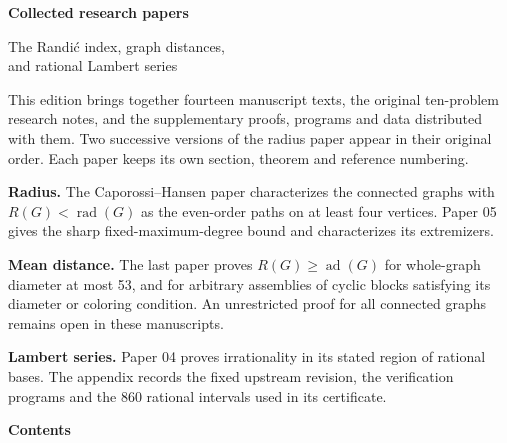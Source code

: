 \documentclass[11pt,a4paper]{article}
\newcommand{\rad}{\operatorname{rad}}\newcommand{\diam}{\operatorname{diam}}
\begin{document}
\thispagestyle{empty}
\vspace*{19mm}\par\vspace{13mm}
{\noindent\fontsize{33}{39}\selectfont\bfseries Collected research papers\par}
\vspace{5mm}
{\noindent\LARGE The Randi\'c index, graph distances,\\[3pt]and rational Lambert series\par}
\vspace{10mm}\noindent{\color{volblue}\rule{0.25\linewidth}{1.1pt}}\par\vspace{9mm}
\noindent This edition brings together fourteen manuscript texts, the original ten-problem research notes, and the supplementary proofs, programs and data distributed with them. Two successive versions of the radius paper appear in their original order. Each paper keeps its own section, theorem and reference numbering.\par
\vspace{6mm}
\noindent\textbf{Radius.} The Caporossi--Hansen paper characterizes the connected graphs with $R(G)<\rad(G)$ as the even-order paths on at least four vertices. Paper 05 gives the sharp fixed-maximum-degree bound and characterizes its extremizers.\par\vspace{4mm}
\noindent\textbf{Mean distance.} The last paper proves $R(G)\ge\operatorname{ad}(G)$ for whole-graph diameter at most 53, and for arbitrary assemblies of cyclic blocks satisfying its diameter or coloring condition. An unrestricted proof for all connected graphs remains open in these manuscripts.\par\vspace{4mm}
\noindent\textbf{Lambert series.} Paper 04 proves irrationality in its stated region of rational bases. The appendix records the fixed upstream revision, the verification programs and the 860 rational intervals used in its certificate.\par
\vfill{}\clearpage
{}\thispagestyle{plain}
{\noindent\huge\bfseries Contents\par}\vspace{3mm}
\end{document}
